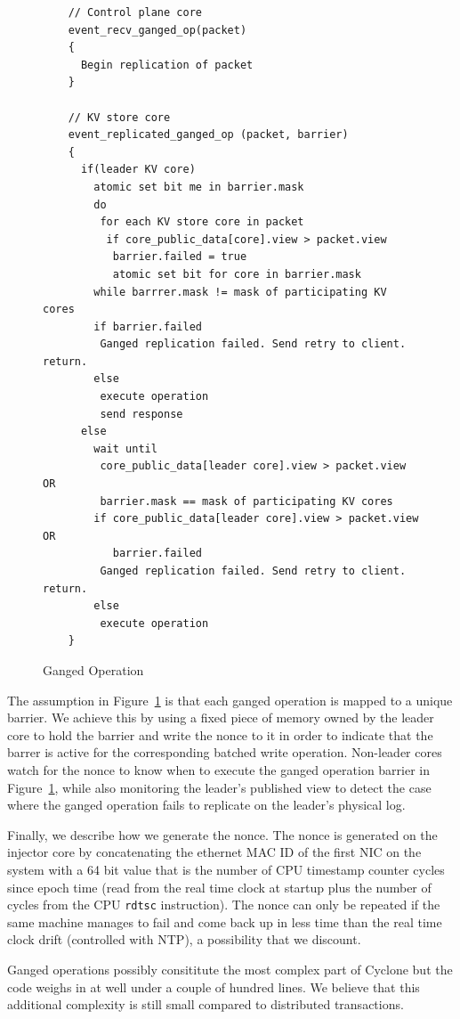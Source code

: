 \documentclass[10pt, preprint, nonatbib]{sigplanconf}
\begin{document}
\begin{figure}
  \centering
\begin{verbatim}
    // Control plane core
    event_recv_ganged_op(packet)
    {
      Begin replication of packet
    }

    // KV store core
    event_replicated_ganged_op (packet, barrier)
    {
      if(leader KV core)
        atomic set bit me in barrier.mask         
        do
         for each KV store core in packet
          if core_public_data[core].view > packet.view
           barrier.failed = true 
           atomic set bit for core in barrier.mask
        while barrrer.mask != mask of participating KV cores
        if barrier.failed
         Ganged replication failed. Send retry to client. return.
        else       
         execute operation
         send response
      else
        wait until 
         core_public_data[leader core].view > packet.view OR
         barrier.mask == mask of participating KV cores
        if core_public_data[leader core].view > packet.view OR
           barrier.failed
         Ganged replication failed. Send retry to client. return.
        else
         execute operation
    }
\end{verbatim}
\caption{Ganged Operation}
\label{fig:ganged_ops}
\end{figure}

The assumption in Figure~\ref{fig:ganged_ops} is that each ganged operation is
mapped to a unique barrier. We achieve this by using a fixed piece of memory
owned by the leader core to hold the barrier and write the nonce to it in order
to indicate that the barrer is active for the corresponding batched write
operation. Non-leader cores watch for the nonce to know when to execute the
ganged operation barrier in Figure~\ref{fig:ganged_ops}, while also monitoring
the leader's published view to detect the case where the ganged operation fails
to replicate on the leader's physical log.

Finally, we describe how we generate the nonce. The nonce is generated on the
injector core by concatenating the ethernet MAC ID of the first NIC on the
system with a 64 bit value that is the number of CPU timestamp counter cycles
since epoch time (read from the real time clock at startup plus the number of
cycles from the CPU {\tt rdtsc} instruction). The nonce can only be repeated if
the same machine manages to fail and come back up in less time than the real
time clock drift (controlled with NTP), a possibility that we discount.

Ganged operations possibly consititute the most complex part of Cyclone but the
code weighs in at well under a couple of hundred lines. We believe that
this additional complexity is still small compared to distributed transactions.
\end{document}
